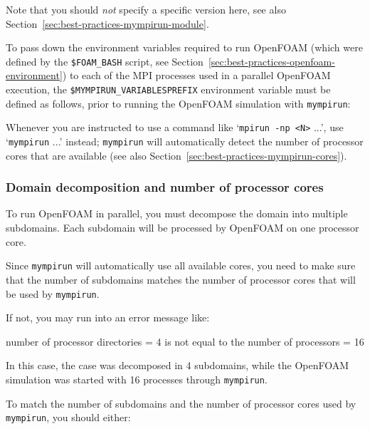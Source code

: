 Note that you should \textit{not} specify a specific version here,
see also Section~\ref{sec:best-practices-mympirun-module}.

To pass down the environment variables required to run OpenFOAM (which were defined by the
\texttt{\small{\$FOAM\_BASH}} script, see Section~\ref{sec:best-practices-openfoam-environment})
to each of the MPI processes used in a parallel OpenFOAM execution,
the \texttt{\small{\$MYMPIRUN\_VARIABLESPREFIX}} environment variable must be defined as follows,
prior to running the OpenFOAM simulation with \texttt{\small{mympirun}}:

\begin{prompt}
\end{prompt}

Whenever you are instructed to use a command like `\texttt{\small{mpirun -np <N>}} ...',
use `\texttt{\small{mympirun}} ...' instead; \texttt{\small{mympirun}} will automatically detect the number of
processor cores that are available (see also Section~\ref{sec:best-practices-mympirun-cores}).


\subsubsection{Domain decomposition and number of processor cores}
\label{sec:best-practices-openfoam-domain-decomposition-processor-cores}

To run OpenFOAM in parallel, you must decompose the domain into multiple subdomains.
Each subdomain will be processed by OpenFOAM on one processor core.

Since {\small\texttt{mympirun}} will automatically use all available cores, you need to make sure
that the number of subdomains matches the number of processor cores that will be used by {\small\texttt{mympirun}}.

If not, you may run into an error message like:

\begin{prompt}
number of processor directories = 4 is not equal to the number of processors = 16
\end{prompt}

In this case, the case was decomposed in 4 subdomains, while the OpenFOAM simulation was started with 16 processes
through {\small\texttt{mympirun}}.

To match the number of subdomains and the number of processor cores used by {\small\texttt{mympirun}}, 
you should either:

